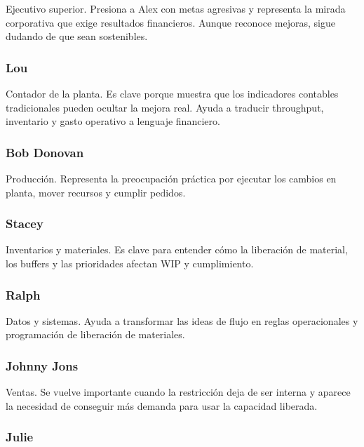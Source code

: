 \documentclass[
  11pt,
]{article}
\begin{document}
Ejecutivo superior. Presiona a Alex con metas agresivas y representa la
mirada corporativa que exige resultados financieros. Aunque reconoce
mejoras, sigue dudando de que sean sostenibles.

\hypertarget{lou}{%
\subsubsection{Lou}\label{lou}}

Contador de la planta. Es clave porque muestra que los indicadores
contables tradicionales pueden ocultar la mejora real. Ayuda a traducir
throughput, inventario y gasto operativo a lenguaje financiero.

\hypertarget{bob-donovan}{%
\subsubsection{Bob Donovan}\label{bob-donovan}}

Producción. Representa la preocupación práctica por ejecutar los cambios
en planta, mover recursos y cumplir pedidos.

\hypertarget{stacey}{%
\subsubsection{Stacey}\label{stacey}}

Inventarios y materiales. Es clave para entender cómo la liberación de
material, los buffers y las prioridades afectan WIP y cumplimiento.

\hypertarget{ralph}{%
\subsubsection{Ralph}\label{ralph}}

Datos y sistemas. Ayuda a transformar las ideas de flujo en reglas
operacionales y programación de liberación de materiales.

\hypertarget{johnny-jons}{%
\subsubsection{Johnny Jons}\label{johnny-jons}}

Ventas. Se vuelve importante cuando la restricción deja de ser interna y
aparece la necesidad de conseguir más demanda para usar la capacidad
liberada.

\hypertarget{julie}{%
\subsubsection{Julie}\label{julie}}
\end{document}
